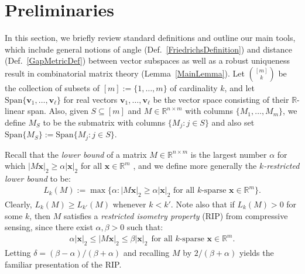 \documentclass[journal, onecolumn]{IEEEtran}
\begin{document}
\section{Preliminaries}\label{Preliminaries}
In this section, we briefly review standard definitions and outline our main tools, which include general notions of angle (Def.~\ref{FriedrichsDefinition}) and distance (Def.~\ref{GapMetricDef}) between vector subspaces as well as a robust uniqueness result in combinatorial matrix theory (Lemma~\ref{MainLemma}).
Let ${[m] \choose k}$ be the collection of subsets of $[m] := \{1,\ldots,m\}$ of cardinality $k$, and let $\text{Span}\{\mathbf{v}_1, \ldots, \mathbf{v}_\ell\}$ for real vectors $\mathbf{v}_1, \ldots, \mathbf{v}_\ell$ be the vector space consisting of their $\mathbb{R}$-linear span.
%
%
Also, given $S \subseteq [m]$ and $M \in \mathbb{R}^{n \times m}$ with columns $\{M_1,\ldots,M_m\}$, we define $M_S$ to be the submatrix with columns $\{M_j: j \in S\}$ and also set $\text{Span}\{M_S\} := \text{Span}\{M_j : j \in S\}$.  

Recall that the \emph{lower bound} of a matrix $M \in \mathbb{R}^{n \times m}$ is the largest number $\alpha$ for which $|M\mathbf{x}|_2 \geq \alpha|\mathbf{x}|_2$ for all $\mathbf{x} \in \mathbb{R}^m$ \cite{grcar2010matrix}, and we define more generally the \textit{$k$-restricted lower bound} to be:
\begin{align}
L_k(M) := \max \{ \alpha : |M\mathbf{x}|_2 \geq \alpha|\mathbf{x}|_2 \text{ for all $k$-sparse } \mathbf{x} \in \mathbb{R}^m\}.
\end{align}
Clearly, $L_k(M) \geq L_{k'}(M)$ whenever $k < k'$. Note also that if $L_k(M) > 0$ for some $k$, then $M$ satisfies a \emph{restricted isometry property} (RIP) \cite{CandesTao05} from compressive sensing, since there exist $\alpha, \beta > 0$ such that:
\begin{align}
\alpha|\mathbf{x}|_2 \leq |M\mathbf{x}|_2 \leq \beta|\mathbf{x}|_2 \ \ \text{for all $k$-sparse } \mathbf{x} \in \mathbb{R}^m.
\end{align}
Letting $\delta = (\beta - \alpha)/(\beta + \alpha)$ and recalling $M$ by $2/(\beta + \alpha)$ yields the familiar presentation of the RIP.
\end{document}
